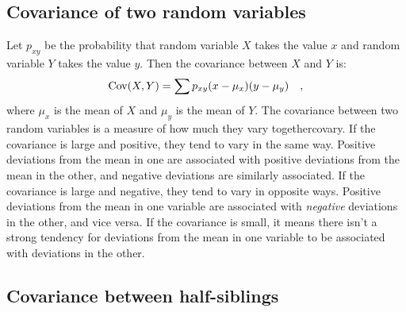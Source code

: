 \subsection*{Covariance of two random variables}

Let $p_{xy}$ be the probability that random variable $X$ takes the
value $x$ and random variable $Y$ takes the value $y$.  Then the
covariance between $X$ and $Y$ is:
\[
\mbox{Cov}(X,Y) = \sum p_{xy}(x - \mu_x)(y - \mu_y) \quad ,
\]
where $\mu_x$ is the mean of $X$ and $\mu_y$ is the mean of $Y$. The
covariance between two random variables is a measure of how much they
vary together{\dash}covary. If the covariance is large and positive,
they tend to vary in the same way. Positive deviations from the mean
in one are associated with positive deviations from the mean in the
other, and negative deviations are similarly associated. If the
covariance is large and negative, they tend to vary in opposite
ways. Positive deviations from the mean in one variable are associated
with {\it negative\/} deviations in the other, and vice versa. If the
covariance is small, it means there isn't a strong tendency for
deviations from the mean in one variable to be associated with
deviations in the other.

\subsection*{Covariance between half-siblings}

